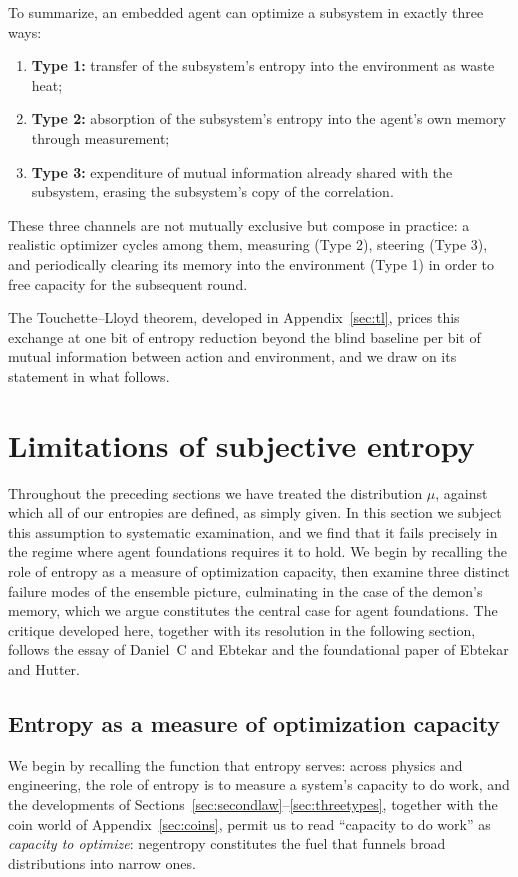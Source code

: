 \documentclass[10pt]{article}
\theoremstyle{definition}
\theoremstyle{remark}
\begin{document}
To summarize, an embedded agent can optimize a subsystem in exactly three ways:
\begin{enumerate}[leftmargin=2em]
  \item \textbf{Type 1:} transfer of the subsystem's entropy into the environment as waste heat;
  \item \textbf{Type 2:} absorption of the subsystem's entropy into the agent's own memory through measurement;
  \item \textbf{Type 3:} expenditure of mutual information already shared with the subsystem, erasing the subsystem's copy of the correlation.
\end{enumerate}
These three channels are not mutually exclusive but compose in practice: a realistic optimizer cycles among them, measuring (Type 2), steering (Type 3), and periodically clearing its memory into the environment (Type 1) in order to free capacity for the subsequent round.

The Touchette--Lloyd theorem, developed in Appendix~\ref{sec:tl}, prices this exchange at one bit of entropy reduction beyond the blind baseline per bit of mutual information between action and environment, and we draw on its statement in what follows.
\section{Limitations of subjective entropy}
\label{sec:subjective}

Throughout the preceding sections we have treated the distribution $\mu$, against which all of our entropies are defined, as simply given. In this section we subject this assumption to systematic examination, and we find that it fails precisely in the regime where agent foundations requires it to hold. We begin by recalling the role of entropy as a measure of optimization capacity, then examine three distinct failure modes of the ensemble picture, culminating in the case of the demon's memory, which we argue constitutes the central case for agent foundations. The critique developed here, together with its resolution in the following section, follows the essay of Daniel~C and Ebtekar and the foundational paper of Ebtekar and Hutter.

\subsection{Entropy as a measure of optimization capacity}
\label{sec:capacity}

We begin by recalling the function that entropy serves: across physics and engineering, the role of entropy is to measure a system's capacity to do work, and the developments of Sections~\ref{sec:secondlaw}--\ref{sec:threetypes}, together with the coin world of Appendix~\ref{sec:coins}, permit us to read ``capacity to do work'' as \emph{capacity to optimize}: negentropy constitutes the fuel that funnels broad distributions into narrow ones.
\end{document}
